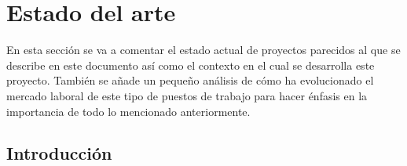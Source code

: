 \section{Estado del arte}
	\begin{text}
		En esta sección se va a comentar el estado actual de proyectos parecidos al que se describe en este documento así como el contexto en el cual se desarrolla este proyecto. También se añade un pequeño análisis de cómo ha evolucionado el mercado laboral de este tipo de puestos de trabajo para hacer énfasis en la importancia de todo lo mencionado anteriormente.
	\end{text}

	\subsection{Introducción}
